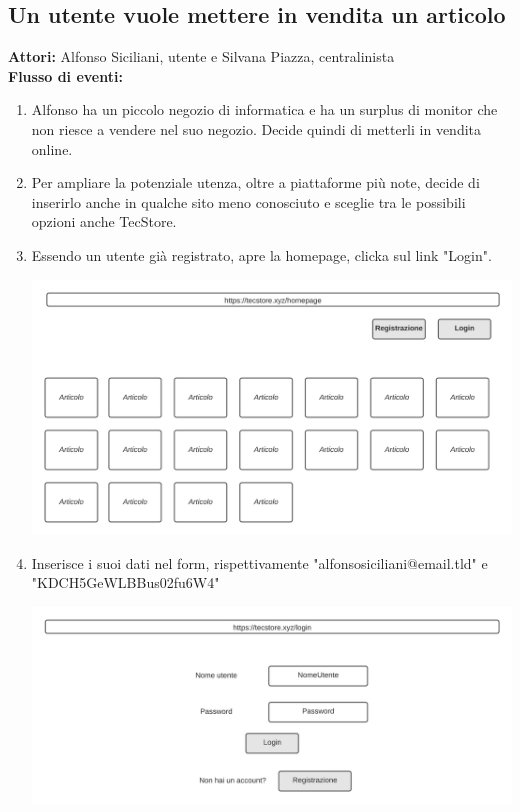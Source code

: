 \documentclass[12pt,a4paper]{article}
\begin{document}
\subsection{Un utente vuole mettere in vendita un articolo}
\textbf{Attori:} Alfonso Siciliani, utente e Silvana Piazza, centralinista \\

\noindent
\textbf{Flusso di eventi:}

\begin{enumerate}

\item Alfonso ha un piccolo negozio di informatica e ha un surplus di monitor che non riesce a vendere nel suo negozio. Decide quindi di metterli in vendita online.

\item Per ampliare la potenziale utenza, oltre a piattaforme più note, decide di inserirlo anche in qualche sito meno conosciuto e sceglie tra le possibili opzioni anche TecStore.
\newpage

\item Essendo un utente già registrato, apre la homepage, clicka sul link "Login".

\includegraphics[width=\textwidth]{homepage}

\item Inserisce i suoi dati nel form, rispettivamente "alfonsosiciliani@email.tld" e "KDCH5GeWLBBus02fu6W4"

\includegraphics[width=\textwidth]{login}


\end{enumerate}
\end{document}
